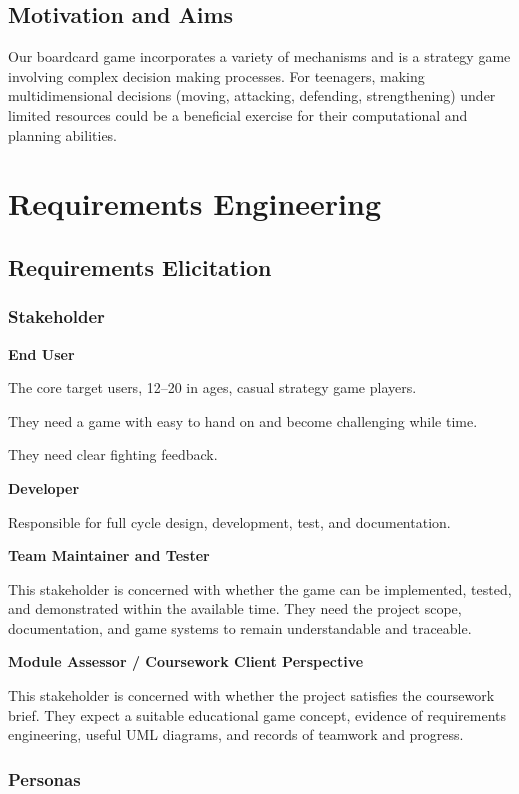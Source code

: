 \documentclass[12pt,a4paper]{report}
\begin{document}
\section{Motivation and Aims}

Our boardcard game incorporates a variety of mechanisms and is a strategy game involving complex decision making processes. For teenagers, making multidimensional decisions (moving, attacking, defending, strengthening) under limited resources could be a beneficial exercise for their computational and planning abilities.

\chapter{Requirements Engineering}

\section{Requirements Elicitation}

\subsection{Stakeholder}

\textbf{End User}

The core target users, 12--20 in ages, casual strategy game players.

They need a game with easy to hand on and become challenging while time.

They need clear fighting feedback.

\textbf{Developer}

Responsible for full cycle design, development, test, and documentation.

\textbf{Team Maintainer and Tester}

This stakeholder is concerned with whether the game can be implemented, tested, and demonstrated within the available time. They need the project scope, documentation, and game systems to remain understandable and traceable.

\textbf{Module Assessor / Coursework Client Perspective}

This stakeholder is concerned with whether the project satisfies the coursework brief. They expect a suitable educational game concept, evidence of requirements engineering, useful UML diagrams, and records of teamwork and progress.

\subsection{Personas}
\end{document}
